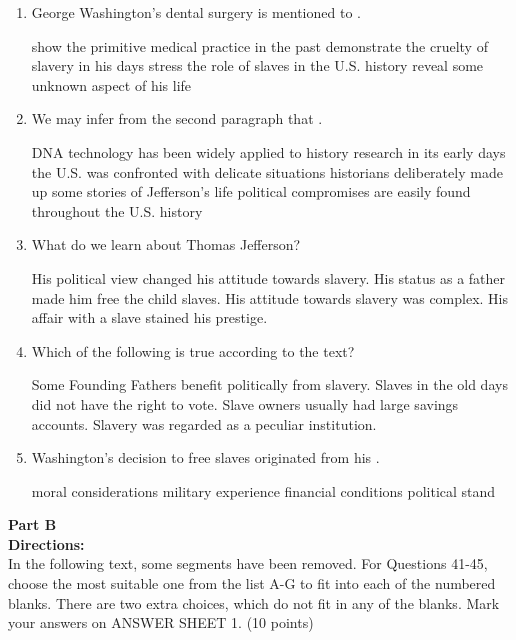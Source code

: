 \begin{enumerate}[resume]
	\item
George Washington's dental surgery is mentioned to \lineread.


\fourchoices
{show the primitive medical practice in the past}
{demonstrate the cruelty of slavery in his days}
{stress the role of slaves in the U.S. history}
{reveal some unknown aspect of his life}



\item
We may infer from the second paragraph that \lineread.


\fourchoices
{DNA technology has been widely applied to history research}
{in its early days the U.S. was confronted with delicate situations}
{historians deliberately made up some stories of Jefferson's life}
{political compromises are easily found throughout the U.S. history}



\item
What do we learn about Thomas Jefferson?


\fourchoices
{His political view changed his attitude towards slavery.}
{His status as a father made him free the child slaves.}
{His attitude towards slavery was complex.}
{His affair with a slave stained his prestige.}


\item
Which of the following is true according to the text?


\fourchoices
{Some Founding Fathers benefit politically from slavery.}
{Slaves in the old days did not have the right to vote.}
{Slave owners usually had large savings accounts.}
{Slavery was regarded as a peculiar institution.}


\item
Washington's decision to free slaves originated from his \lineread.


\fourchoices
{moral considerations}
{military experience}
{financial conditions}
{political stand}


\end{enumerate}


\newpage

\noindent
\textbf{Part B}\\
\textbf{Directions:}\\
In the following text, some segments have been removed. For
Questions 41-45, choose the most suitable one from the list A-G to fit
into each of the numbered blanks. There are two extra choices, which do
not fit in any of the blanks. Mark your answers on ANSWER SHEET 1. (10
points)


